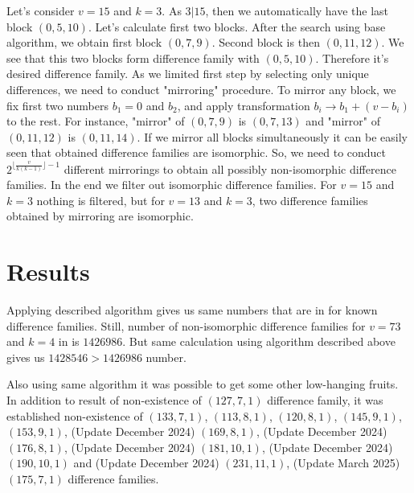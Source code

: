 \documentclass{amsart}
\theoremstyle{plain}
\theoremstyle{definition}
\theoremstyle{remark}
\begin{document}
Let's consider $v = 15$ and $k = 3$. As $3|15$, then we automatically have the last block $(0,5,10)$. Let's calculate first two blocks. After the search using base algorithm, we obtain first block $(0,7,9)$. Second block is then $(0,11,12)$. We see that this two blocks form difference family with $(0,5,10)$. Therefore it's desired difference family. As we limited first step by selecting only unique differences, we need to conduct "mirroring" procedure. To mirror any block, we fix first two numbers $b_1 = 0$ and $b_2$, and apply transformation $b_i \rightarrow b_1 + (v - b_i)$ to the rest. For instance, "mirror" of $(0,7,9)$ is $(0,7,13)$ and "mirror" of $(0,11,12)$ is $(0,11,14)$. If we mirror all blocks simultaneously it can be easily seen that obtained difference families are isomorphic. So, we need to conduct $2^{\lfloor\frac{v}{k(k-1)}\rfloor - 1}$ different mirrorings to obtain all possibly non-isomorphic difference families. In the end we filter out isomorphic difference families. For $v=15$ and $k=3$ nothing is filtered, but for $v=13$ and $k=3$, two difference families obtained by mirroring are isomorphic.

\section{Results}
Applying described algorithm gives us same numbers that are in \cite{HoCD} for known difference families. Still, number of non-isomorphic difference families for $v=73$ and $k=4$ in \cite{BaiTop} is $1426986$. But same calculation using algorithm described above gives us $1428546 > 1426986$ number.

Also using same algorithm it was possible to get some other low-hanging fruits. In addition to \cite{BaiTop1} result of non-existence of $(127,7,1)$ difference family, it was established non-existence of $(133, 7, 1)$, $(113, 8, 1)$, $(120, 8, 1)$, $(145, 9, 1)$, $(153, 9, 1)$, (Update December 2024) $(169, 8, 1)$, (Update December 2024) $(176, 8, 1)$, (Update December 2024) $(181, 10, 1)$, (Update December 2024) $(190, 10, 1)$ and (Update December 2024) $(231, 11, 1)$, (Update March 2025) $(175,7,1)$ difference families.
\end{document}
